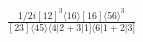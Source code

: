 \documentclass[varwidth, border=5pt]{standalone}
\begin{document}
\begin{my}
$\begin{gathered}
\scriptscriptstyle\frac{1/2i[12]^3\langle16\rangle[16]\langle56\rangle^3}{[23]\langle45\rangle\langle4|2+3|1]\langle6|1+2|3]}
\end{gathered}$
\end{my}
\end{document}
